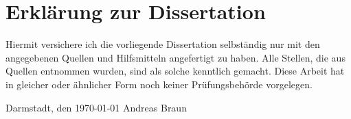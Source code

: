 \chapter*{Erkl\"arung zur Dissertation}
\thispagestyle{empty}

Hiermit versichere ich die vorliegende Dissertation selbst\"andig nur mit den angegebenen Quellen
und Hilfsmitteln angefertigt zu haben. Alle Stellen, die aus Quellen entnommen wurden, sind als solche
kenntlich gemacht. Diese Arbeit hat in gleicher oder ähnlicher Form noch keiner Prüfungsbehörde
vorgelegen.

\vspace{2cm}

Darmstadt, den \ddmmyyyydate \today  \hspace{6cm} Andreas Braun

